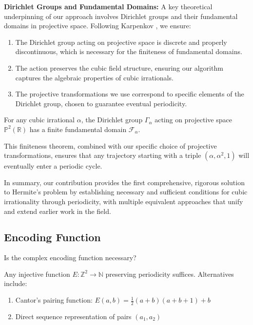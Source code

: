\begin{response}
\textbf{Dirichlet Groups and Fundamental Domains:} A key theoretical underpinning of our approach involves Dirichlet groups and their fundamental domains in projective space. Following Karpenkov \cite{Karpenkov2022, Karpenkov2024}, we ensure:

\begin{enumerate}
\item The Dirichlet group acting on projective space is discrete and properly discontinuous, which is necessary for the finiteness of fundamental domains.
\item The action preserves the cubic field structure, ensuring our algorithm captures the algebraic properties of cubic irrationals.
\item The projective transformations we use correspond to specific elements of the Dirichlet group, chosen to guarantee eventual periodicity.
\end{enumerate}

\begin{theorem}\label{thm:finite_domain_objection}
For any cubic irrational $\alpha$, the Dirichlet group $\Gamma_\alpha$ acting on projective space $\mathbb{P}^2(\mathbb{R})$ has a finite fundamental domain $\mathcal{F}_\alpha$.
\end{theorem}

This finiteness theorem, combined with our specific choice of projective transformations, ensures that any trajectory starting with a triple $(\alpha, \alpha^2, 1)$ will eventually enter a periodic cycle.

In summary, our contribution provides the first comprehensive, rigorous solution to Hermite's problem by establishing necessary and sufficient conditions for cubic irrationality through periodicity, with multiple equivalent approaches that unify and extend earlier work in the field.
\end{response}

\subsection{Encoding Function}

\begin{objection}
Is the complex encoding function necessary?
\end{objection}

\begin{response}
Any injective function $E: \mathbb{Z}^2 \to \mathbb{N}$ preserving periodicity suffices. Alternatives include:
\begin{enumerate}
\item Cantor's pairing function: $E(a,b) = \frac{1}{2}(a+b)(a+b+1) + b$
\item Direct sequence representation of pairs $(a_1, a_2)$
\end{enumerate}
\end{response}

